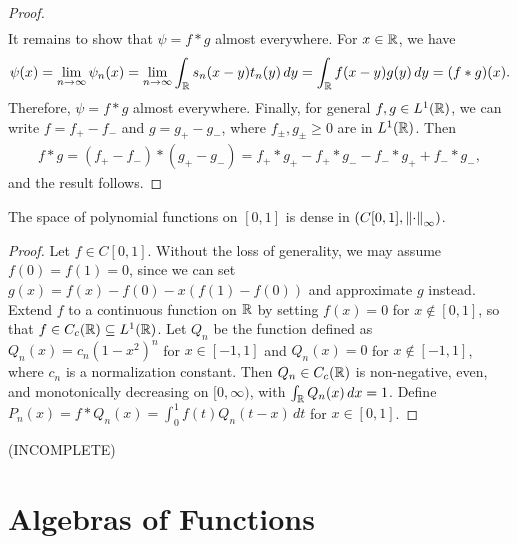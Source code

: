 \begin{proof}
\begin{align}
    \end{align}
    It remains to show that $\psi = f \ast g$ almost everywhere. For $x \in \mathbb{R}$, we have
    \begin{align}
        \psi(x) = \lim_{n \to \infty} \psi_{n}(x) = \lim_{n \to \infty} \int_{\mathbb{R}} s_{n}(x-y)t_{n}(y) \, dy = \int_{\mathbb{R}} f(x-y)g(y) \, dy = (f \ast g)(x).
    \end{align}
    Therefore, $\psi = f \ast g$ almost everywhere. Finally, for general $f,g \in L^{1}(\mathbb{R})$, we can write $f = f_{+}-f_{-}$ and $g = g_{+}-g_{-}$, where $f_{\pm},g_{\pm} \geq 0$ are in $L^{1}(\mathbb{R})$. Then
    \begin{align}
        f \ast g = (f_{+}-f_{-}) \ast (g_{+}-g_{-}) = f_{+} \ast g_{+} - f_{+} \ast g_{-} - f_{-} \ast g_{+} + f_{-} \ast g_{-},
    \end{align}
    and the result follows.
\end{proof}

\begin{theorem}
    The space of polynomial functions on $[0,1]$ is dense in $(C[0,1],\left\lVert\cdot\right\rVert_{\infty})$.
\end{theorem}
\begin{proof}
    Let $f \in C[0,1]$. Without the loss of generality, we may assume $f(0) = f(1) = 0$, since we can set $g(x) = f(x)-f(0)-x(f(1)-f(0))$ and approximate $g$ instead. Extend $f$ to a continuous function on $\mathbb{R}$ by setting $f(x) = 0$ for $x \notin [0,1]$, so that $f \in C_{c}(\mathbb{R}) \subseteq L^{1}(\mathbb{R})$. Let $Q_{n}$ be the function defined as $Q_{n}(x) = c_{n}(1-x^{2})^{n}$ for $x \in [-1,1]$ and $Q_{n}(x) = 0$ for $x \notin [-1,1]$, where $c_{n}$ is a normalization constant. Then $Q_{n} \in C_{c}(\mathbb{R})$ is non-negative, even, and monotonically decreasing on $[0,\infty)$, with $\int_{\mathbb{R}} Q_{n}(x) \, dx = 1$. Define $P_{n}(x) = f \ast Q_{n}(x) = \int_{0}^{1} f(t)Q_{n}(t-x) \, dt$ for $x \in [0,1]$. 
\end{proof}
(INCOMPLETE)

\section{Algebras of Functions}


